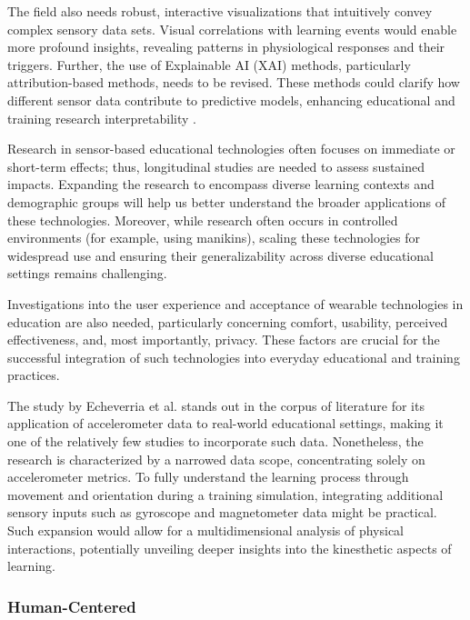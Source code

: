 \documentclass[manuscript,screen,review]{acmart}
\begin{document}
The field also needs robust, interactive visualizations that intuitively convey complex sensory data sets. Visual correlations with learning events would enable more profound insights, revealing patterns in physiological responses and their triggers. Further, the use of Explainable AI (XAI) methods, particularly attribution-based methods, needs to be revised. These methods could clarify how different sensor data contribute to predictive models, enhancing educational and training research interpretability \cite{schoonderwoerd2021human, rojat2021explainable}. 

Research in sensor-based educational technologies often focuses on immediate or short-term effects; thus, longitudinal studies are needed to assess sustained impacts. Expanding the research to encompass diverse learning contexts and demographic groups will help us better understand the broader applications of these technologies. Moreover, while research often occurs in controlled environments (for example, using manikins), scaling these technologies for widespread use and ensuring their generalizability across diverse educational settings remains challenging.

Investigations into the user experience and acceptance of wearable technologies in education are also needed, particularly concerning comfort, usability, perceived effectiveness, and, most importantly, privacy. These factors are crucial for the successful integration of such technologies into everyday educational and training practices.

The study by Echeverria et al. \cite{1296637108} stands out in the corpus of literature for its application of accelerometer data to real-world educational settings, making it one of the relatively few studies to incorporate such data. Nonetheless, the research is characterized by a narrowed data scope, concentrating solely on accelerometer metrics. To fully understand the learning process through movement and orientation during a training simulation, integrating additional sensory inputs such as gyroscope and magnetometer data might be practical. Such expansion would allow for a multidimensional analysis of physical interactions, potentially unveiling deeper insights into the kinesthetic aspects of learning.


\subsubsection{Human-Centered}\label{subsubsec:human}
\end{document}
